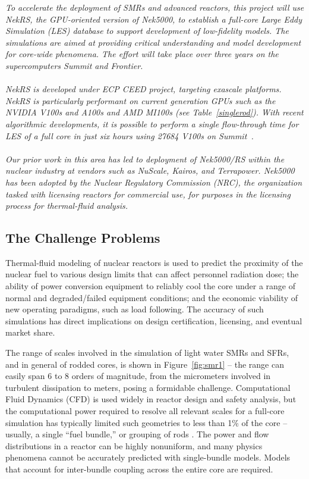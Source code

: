 \begin{displayquote}
{\it
To accelerate the deployment of SMRs and advanced reactors, this project will
use NekRS, the GPU-oriented version of Nek5000, to establish a full-core Large Eddy
Simulation (LES) database to support development of low-fidelity models.  
The simulations are aimed at providing critical understanding and model
development for core-wide phenomena.  The effort will take place over three
years on the supercomputers Summit and Frontier.\\
\\
\noindent NekRS is developed under ECP CEED project, targeting exascale platforms.
NekRS is particularly performant on current generation GPUs such as the NVIDIA
V100s and A100s and AMD MI100s (see Table~\ref{singlerod}).  
With recent algorithmic developments, it is possible
to perform a single flow-through time for LES of a full core in just six hours
using 27684 V100s on Summit~\cite{peb21}.\\
\\
Our prior work in this area has led to deployment of Nek5000/RS within the
nuclear industry at vendors such as NuScale, Kairos, and Terrapower.
Nek5000 has been adopted by the Nuclear Regulatory Commission (NRC), the
organization tasked with licensing reactors for commercial use,
for purposes in the licensing process for thermal-fluid analysis.
}
\end{displayquote}

\vspace{-.25in} \subsection{The Challenge Problems}
\vspace{-.2in}

Thermal-fluid modeling of nuclear reactors is used to predict the
proximity of the nuclear fuel to various design limits that can affect
personnel radiation dose; the ability of power conversion equipment to reliably
cool the core under a range of normal and degraded/failed equipment conditions;
and the economic viability of new operating paradigms, such as load following.
The accuracy of such simulations has direct implications on design
certification, licensing, and eventual market share.

The range of scales involved in the simulation of light water SMRs and SFRs, and in general of rodded cores, is shown in Figure~\ref{fig:smr1} -- the range can easily span 6 to 8 orders of magnitude, from the micrometers involved in turbulent dissipation to meters, posing a formidable challenge.
Computational Fluid Dynamics (CFD) is used widely in reactor design and safety
analysis, but the computational power required to resolve all relevant scales for a full-core simulation has typically limited
such geometries to less than 1\% of the core -- usually, a single ``fuel
bundle,'' or grouping of rods \cite{wang2020,fanning,wang2020b}.
The power and flow distributions in a reactor can be highly nonuniform, and many physics
phenomena cannot be accurately predicted with single-bundle models. Models that
account for inter-bundle coupling across the entire core are required.

